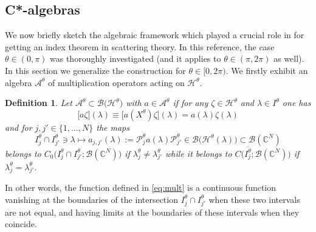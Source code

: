 \documentclass[11pt]{article}
\def\AA{\mathcal A}
\def\B{\mathscr B}
\def\C{\mathbb C}
\def\Hrond{\mathscr H}
\def\P{\mathcal P}
\newtheorem{Definition}[Theorem]{Definition}
\begin{document}
\subsection{C*-algebras}\label{subsecC}

We now briefly sketch the algebraic framework which played a crucial role in \cite{APRR}
for getting an index theorem in scattering theory. 
In this reference, the case $\theta\in (0,\pi)$ was thoroughly investigated 
(and it applies to $\theta \in (\pi,2\pi)$ as well). 
In this section we generalize the construction for $\theta \in [0,2\pi)$.
We firstly exhibit an algebra $\AA^\theta$ of multiplication operators acting on $\Hrond^\theta$.

\begin{Definition}\label{def_A_theta}
Let $\AA^\theta\subset \B\big(\Hrond^\theta\big)$ with  $a\in \AA^\theta$ if for any $\zeta \in \Hrond^\theta$ and $\lambda \in I^\theta$ one has
$$
\big[a\zeta\big](\lambda)\equiv \big[a(X^\theta)\zeta\big](\lambda)= a(\lambda) \zeta(\lambda)
$$
and for $j,j'\in \{1,\dots,N\}$ the maps
\begin{equation}\label{eq:mult}
I_j^\theta \cap I_{j'}^\theta \ni \lambda \mapsto a_{j,j'}(\lambda) :=
\P_j^\theta a(\lambda)\P_{j'}^\theta \in \B\big(\Hrond^\theta(\lambda)\big) \subset \B(\C^N)
\end{equation}
belongs to $C_0\big(I_j^\theta \cap I_{j'}^\theta; \B(\C^N)\big)$ if $\lambda_j^\theta\neq \lambda_{j'}^\theta$ while it belongs to $C\big(\overline{I_j^\theta}; \B(\C^N)\big)$ if $\lambda_j^\theta=\lambda_{j'}^\theta$.
\end{Definition}

In other words, the function defined in \eqref{eq:mult}
is a continuous function vanishing at the boundaries of the intersection $I_j^\theta \cap I_{j'}^\theta$ when these two intervals are not equal, and having limits at the boundaries of these intervals when they coincide. 
\end{document}
